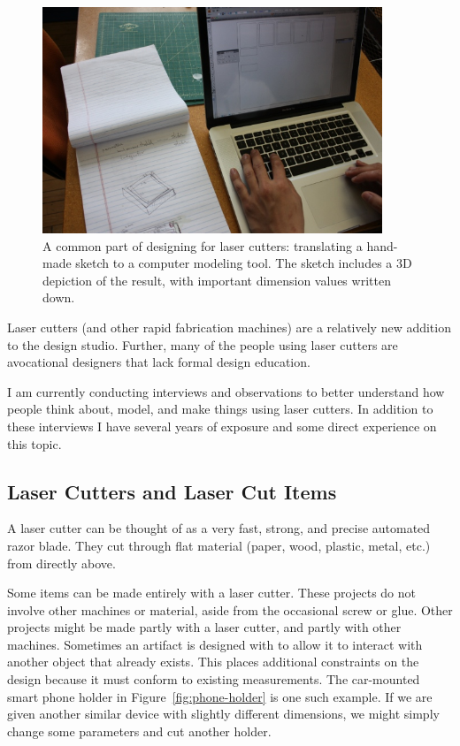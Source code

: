\documentclass[12pt]{article}
\begin{document}
\begin{figure}[h] %
   \centering
   \includegraphics[width=4in]{img/translate-sketch-to-computer.jpg} 
   \caption{A common part of designing for laser cutters: translating
     a hand-made sketch to a computer modeling tool. The sketch
     includes a 3D depiction of the result, with important dimension
     values written down.}
   \label{fig:translating-to-computer}
\end{figure}

Laser cutters (and other rapid fabrication machines) are a relatively
new addition to the design studio. Further, many of the people using
laser cutters are avocational designers that lack formal design
education.

I am currently conducting interviews and observations to better
understand how people think about, model, and make things using laser
cutters. In addition to these interviews I have several years of
exposure and some direct experience on this topic.

\subsection{Laser Cutters and Laser Cut Items}

A laser cutter can be thought of as a very fast, strong, and precise
automated razor blade. They cut through flat material (paper, wood,
plastic, metal, etc.) from directly above.

Some items can be made entirely with a laser cutter. These projects do
not involve other machines or material, aside from the occasional
screw or glue. Other projects might be made partly with a laser
cutter, and partly with other machines. Sometimes an artifact is
designed with to allow it to interact with another object that already
exists. This places additional constraints on the design because it
must conform to existing measurements. The car-mounted smart phone
holder in Figure~\ref{fig:phone-holder} is one such example. If we are
given another similar device with slightly different dimensions, we
might simply change some parameters and cut another holder.
\end{document}
